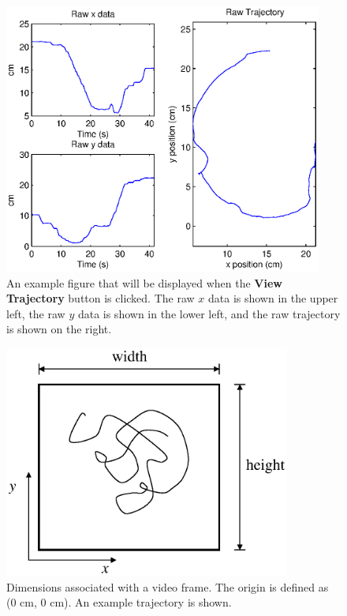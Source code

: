 \documentclass[letterpaper, 11pt]{article}
\begin{document}
\begin{figure}[p]
 \centering
\includegraphics[clip=true, height=3.5in]{ExViewTraj.eps}
\caption{An example figure that will be displayed when the
\textbf{View Trajectory} button is clicked.  The raw $x$ data is
shown in the upper left, the raw $y$ data is shown in the lower
left, and the raw trajectory is shown on the right.}
\label{ViewTrajFig}
\end{figure}
\begin{figure}[p]
 \centering
\includegraphics[clip=true, height=3in]{exframe.eps}
\caption{Dimensions associated with a video frame.  The origin is
defined as (0 cm, 0 cm).  An example trajectory is shown.}
\label{exframe}
\end{figure}
\end{document}
